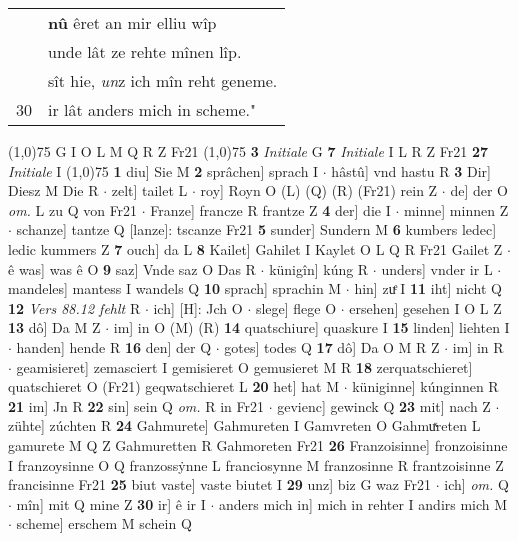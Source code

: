 \documentclass[8pt,a4paper,notitlepage]{article}
\begin{document}
\begin{table}[ht]
\begin{minipage}[t]{0.5\linewidth}
\begin{tabular}{rl}
 & \textbf{nû} êret an mir elliu wîp\\ 
 & unde lât ze rehte mînen lîp.\\ 
 & sît hie, \textit{un}z ich mîn reht geneme.\\ 
30 & ir lât anders mich in scheme."\\ 
\end{tabular}
\scriptsize
\line(1,0){75} \newline
G I O L M Q R Z Fr21 \newline
\line(1,0){75} \newline
\textbf{3} \textit{Initiale} G  \textbf{7} \textit{Initiale} I L R Z Fr21  \textbf{27} \textit{Initiale} I  \newline
\line(1,0){75} \newline
\textbf{1} diu] Sie M \textbf{2} sprâchen] sprach I  $\cdot$ hâstû] vnd hastu R \textbf{3} Dir] Diesz M Die R  $\cdot$ zelt] tailet L  $\cdot$ roy] Royn O (L) (Q) (R) (Fr21) rein Z  $\cdot$ de] der O \textit{om.} L zu Q von Fr21  $\cdot$ Franze] francze R frantze Z \textbf{4} der] die I  $\cdot$ minne] minnen Z  $\cdot$ schanze] tantze Q [lanze]: tscanze Fr21 \textbf{5} sunder] Sundern M \textbf{6} kumbers ledec] ledic kummers Z \textbf{7} ouch] da L \textbf{8} Kailet] Gahilet I Kaylet O L Q R Fr21 Gailet Z  $\cdot$ ê was] was ê O \textbf{9} saz] Vnde saz O Das R  $\cdot$ künigîn] kúng R  $\cdot$ unders] vnder ir L  $\cdot$ mandeles] mantess I wandels Q \textbf{10} sprach] sprachin M  $\cdot$ hin] zuͤ I \textbf{11} iht] nicht Q \textbf{12} \textit{Vers 88.12 fehlt} R   $\cdot$ ich] [H]: Jch O  $\cdot$ slege] flege O  $\cdot$ ersehen] gesehen I O L Z \textbf{13} dô] Da M Z  $\cdot$ im] in O (M) (R) \textbf{14} quatschiure] quaskure I \textbf{15} linden] liehten I  $\cdot$ handen] hende R \textbf{16} den] der Q  $\cdot$ gotes] todes Q \textbf{17} dô] Da O M R Z  $\cdot$ im] in R  $\cdot$ geamisieret] zemasciert I gemisieret O gemusieret M R \textbf{18} zerquatschieret] quatschieret O (Fr21) geqwatschieret L \textbf{20} het] hat M  $\cdot$ küniginne] kúnginnen R \textbf{21} im] Jn R \textbf{22} sin] sein Q \textit{om.} R in Fr21  $\cdot$ gevienc] gewinck Q \textbf{23} mit] nach Z  $\cdot$ zühte] zúchten R \textbf{24} Gahmurete] Gahmureten I Gamvreten O Gahmuͯreten L gamurete M Q Z Gahmuretten R Gahmoreten Fr21 \textbf{26} Franzoisinne] fronzoisinne I franzoysinne O Q franzossẏnne L franciosynne M franzosinne R frantzoisinne Z francisinne Fr21 \textbf{25} biut vaste] vaste biutet I \textbf{29} unz] biz G waz Fr21  $\cdot$ ich] \textit{om.} Q  $\cdot$ mîn] mit Q mine Z \textbf{30} ir] ê ir I  $\cdot$ anders mich in] mich in rehter I andirs mich M  $\cdot$ scheme] erschem M schein Q \newline

\end{minipage}
\end{table}
\end{document}
